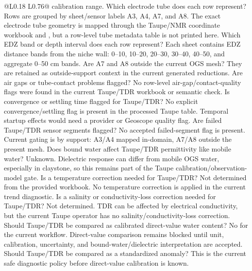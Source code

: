 \begin{longtable}{@{}L{0.18\textwidth} L{0.76\textwidth}@{}}
{calibration range.}
{ Which electrode tube does each row represent?}
{Rows are grouped by sheet/sensor labels A3, A4, A7, and A8.  The exact electrode
tube geometry is mapped through the Taupe/NMR coordinate workbook and
, but a row-level tube metadata table is not printed here.}
{ Which EDZ band or depth interval does each row represent?}
{Each sheet contains EDZ distance bands from the niche wall: 0--10, 10--20, 20--30,
30--40, 40--50, and aggregate 0--50 cm bands.}
{ Are A7 and A8 outside the current OGS mesh?}
{They are retained as outside-support context in the current generated reductions.}
{ Are air gaps or tube-contact problems flagged?}
{No row-level air-gap/contact-quality flags were found in the current Taupe/TDR
workbook or semantic check.}
{ Is convergence or settling time flagged for Taupe/TDR?}
{No explicit convergence/settling flag is present in the processed Taupe table.
Temporal startup effects would need a provider or Geoscope quality flag.}
{ Are failed Taupe/TDR sensor segments flagged?}
{No accepted failed-segment flag is present.  Current gating is by support: A3/A4
mapped in-domain, A7/A8 outside the present mesh.}
{ Does bound water affect Taupe/TDR permittivity like mobile water?}
{Unknown.  Dielectric response can differ from mobile OGS water, especially in
claystone, so this remains part of the Taupe calibration/observation-model gate.}
{ Is a temperature correction needed for Taupe/TDR?}
{Not determined from the provided workbook.  No temperature correction is applied in the
current trend diagnostic.}
{ Is a salinity or conductivity-loss correction needed for Taupe/TDR?}
{Not determined.  TDR can be affected by electrical conductivity, but the current
Taupe operator has no salinity/conductivity-loss correction.}
{ Should Taupe/TDR be compared as calibrated direct-value water content?}
{No for the current workflow.  Direct-value comparison remains blocked until unit,
calibration, uncertainty, and bound-water/dielectric interpretation are accepted.}
{ Should Taupe/TDR be compared as a standardized anomaly?}
{This is the current safe diagnostic policy before direct-value calibration is
known.}

\end{longtable}
